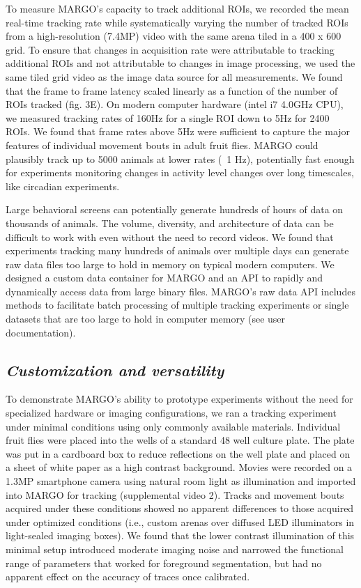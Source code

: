 \documentclass[10pt]{article}
\begin{document}
\begin{multicols}{2}
To measure MARGO's capacity to track additional ROIs, we recorded the mean real-time tracking rate while systematically varying the number of tracked ROIs from a high-resolution (7.4MP) video with the same arena tiled in a 400 x 600 grid. To ensure that changes in acquisition rate were attributable to tracking additional ROIs and not attributable to changes in image processing, we used the same tiled grid video as the image data source for all measurements. We found that the frame to frame latency scaled linearly as a function of the number of ROIs tracked (fig. 3E). On modern computer hardware (intel i7 4.0GHz CPU), we measured tracking rates of 160Hz for a single ROI down to 5Hz for 2400 ROIs. We found that frame rates above 5Hz were sufficient to capture the major features of individual movement bouts in adult fruit flies. MARGO could plausibly track up to 5000 animals at lower rates (~1 Hz), potentially fast enough for experiments monitoring changes in activity level changes over long timescales, like circadian experiments.

Large behavioral screens can potentially generate hundreds of hours of data on thousands of animals. The volume, diversity, and architecture of data can be difficult to work with even without the need to record videos. We found that experiments tracking many hundreds of animals over multiple days can generate raw data files too large to hold in memory on typical modern computers. We designed a custom data container for MARGO and an API to rapidly and dynamically access data from large binary files. MARGO's raw data API includes methods to facilitate batch processing of multiple tracking experiments or single datasets that are too large to hold in computer memory (see user documentation). 

\subsection*{\textit{Customization and versatility}}

To demonstrate MARGO's ability to prototype experiments without the need for specialized hardware or imaging configurations, we ran a tracking experiment under minimal conditions using only commonly available materials.  Individual fruit flies were placed into the wells of a standard 48 well culture plate. The plate was put in a cardboard box to reduce reflections on the well plate and placed on a sheet of white paper as a high contrast background. Movies were recorded on a 1.3MP smartphone camera using natural room light as illumination and imported into MARGO for tracking (supplemental video 2). Tracks and movement bouts acquired under these conditions showed no apparent differences to those acquired under optimized conditions (i.e., custom arenas over diffused LED illuminators in light-sealed imaging boxes). We found that the lower contrast illumination of this minimal setup introduced moderate imaging noise and narrowed the functional range of parameters that worked for foreground segmentation, but had no apparent effect on the accuracy of traces once calibrated.


\end{multicols}
\end{document}
